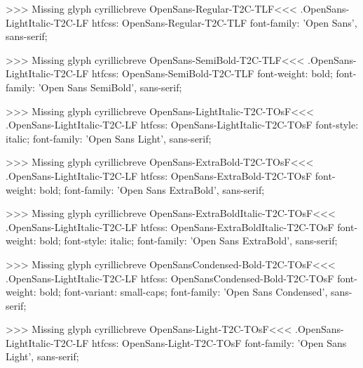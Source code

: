 >>>
Missing glyph	cyrillicbreve
\<OpenSans-Regular-T2C-TLF\><<<
.OpenSans-LightItalic-T2C-LF
htfcss:  OpenSans-Regular-T2C-TLF  font-family: 'Open Sans', sans-serif;

>>>
Missing glyph	cyrillicbreve
\<OpenSans-SemiBold-T2C-TLF\><<<
.OpenSans-LightItalic-T2C-LF
htfcss:  OpenSans-SemiBold-T2C-TLF  font-weight: bold; font-family: 'Open Sans SemiBold', sans-serif;

>>>
Missing glyph	cyrillicbreve
\<OpenSans-LightItalic-T2C-TOsF\><<<
.OpenSans-LightItalic-T2C-LF
htfcss:  OpenSans-LightItalic-T2C-TOsF  font-style: italic; font-family: 'Open Sans Light', sans-serif;

>>>
Missing glyph	cyrillicbreve
\<OpenSans-ExtraBold-T2C-TOsF\><<<
.OpenSans-LightItalic-T2C-LF
htfcss:  OpenSans-ExtraBold-T2C-TOsF  font-weight: bold; font-family: 'Open Sans ExtraBold', sans-serif;

>>>
Missing glyph	cyrillicbreve
\<OpenSans-ExtraBoldItalic-T2C-TOsF\><<<
.OpenSans-LightItalic-T2C-LF
htfcss:  OpenSans-ExtraBoldItalic-T2C-TOsF  font-weight: bold; font-style: italic; font-family: 'Open Sans ExtraBold', sans-serif;

>>>
Missing glyph	cyrillicbreve
\<OpenSansCondensed-Bold-T2C-TOsF\><<<
.OpenSans-LightItalic-T2C-LF
htfcss:  OpenSansCondensed-Bold-T2C-TOsF  font-weight: bold; font-variant: small-caps; font-family: 'Open Sans Condensed', sans-serif;

>>>
Missing glyph	cyrillicbreve
\<OpenSans-Light-T2C-TOsF\><<<
.OpenSans-LightItalic-T2C-LF
htfcss:  OpenSans-Light-T2C-TOsF  font-family: 'Open Sans Light', sans-serif;

